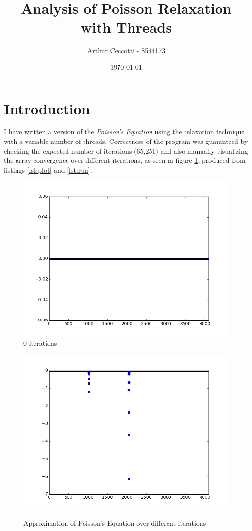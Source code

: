 \documentclass{article}
\title{Analysis of Poisson Relaxation with Threads}
\date{\today}
\author{Arthur Ceccotti - 8544173}
\begin{document}
\maketitle

\section{Introduction}
I have written a version of the \textit{Poisson's Equation} using the relaxation technique with a variable number of threads. Correctness of the program was guaranteed by checking the expected number of iterations (65,251) and also manually visualizing the array convergence over different iterations, as seen in figure \ref{fig:iterations}, produced from listings \ref{lst:plot} and \ref{lst:run}.

\begin{figure}
\label{fig:iterations}
\caption{Approximation of Poisson's Equation over different iterations}
\centering
\begin{minipage}{0.45\textwidth}
  \centering
  \includegraphics[width=1\linewidth, natwidth=800, natheight=600]{graphs/it1.png}\\
  0 iterations
\end{minipage}
\begin{minipage}{0.45\textwidth}
  \centering
  \includegraphics[width=1\linewidth, natwidth=800, natheight=600]{graphs/it10.png}\\

\end{minipage}
\end{figure}
\end{document}
